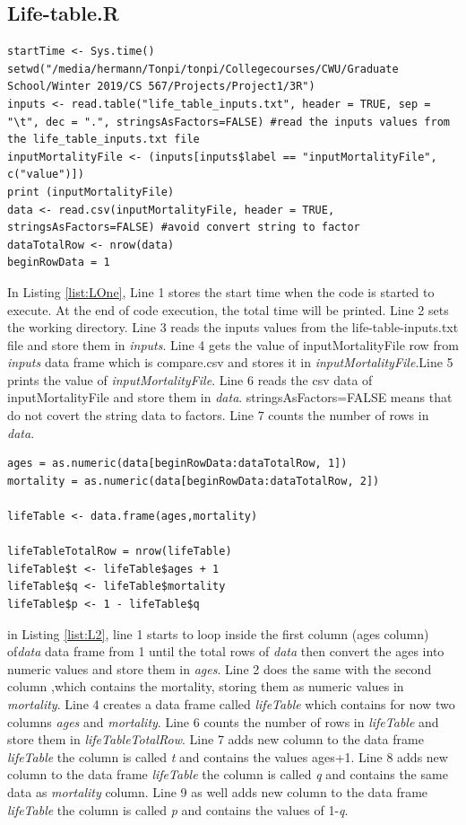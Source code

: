 \documentclass[12pt]{article}
\begin{document}
\subsection{Life-table.R}
\begin{lstlisting}[caption={ Reading The Data Part 1},captionpos=b,label={list:LOne}]
startTime <- Sys.time()
setwd("/media/hermann/Tonpi/tonpi/Collegecourses/CWU/Graduate School/Winter 2019/CS 567/Projects/Project1/3R")
inputs <- read.table("life_table_inputs.txt", header = TRUE, sep = "\t", dec = ".", stringsAsFactors=FALSE) #read the inputs values from the life_table_inputs.txt file
inputMortalityFile <- (inputs[inputs$label == "inputMortalityFile", c("value")])
print (inputMortalityFile)
data <- read.csv(inputMortalityFile, header = TRUE, stringsAsFactors=FALSE) #avoid convert string to factor
dataTotalRow <- nrow(data)
beginRowData = 1
\end{lstlisting}
In Listing \ref{list:LOne}, Line 1 stores the start time when the code is started to execute. At the end of code execution, the total time will be printed. Line 2 sets the working directory. Line 3 reads the inputs values from the life-table-inputs.txt file and store them in \textit{inputs}. Line 4 gets the value of inputMortalityFile row from \textit{inputs} data frame which is compare.csv and stores it in \textit{inputMortalityFile}.Line 5 prints the value of \textit{inputMortalityFile}. Line 6 reads the csv data of inputMortalityFile and store them in \textit{data}. stringsAsFactors=FALSE means that do not covert the string data to factors. Line 7 counts the number of rows in \textit{data}.
\begin{lstlisting}[caption={ Reading The Data Part 2},captionpos=b,label={list:L2}]
ages = as.numeric(data[beginRowData:dataTotalRow, 1])
mortality = as.numeric(data[beginRowData:dataTotalRow, 2])

lifeTable <- data.frame(ages,mortality)

lifeTableTotalRow = nrow(lifeTable)
lifeTable$t <- lifeTable$ages + 1
lifeTable$q <- lifeTable$mortality
lifeTable$p <- 1 - lifeTable$q
\end{lstlisting}
in Listing \ref{list:L2}, line 1 starts to loop inside the first column (ages column) of\textit{data} data frame from 1 until the total rows of \textit{data} then convert the ages into numeric values and store them in \textit{ages}. Line 2 does the same with the second column ,which contains the mortality, storing them as numeric values in \textit{mortality}. Line 4 creates a data frame called \textit{lifeTable} which contains for now two columns \textit{ages} and \textit{mortality}. Line 6 counts the number of rows in \textit{lifeTable} and store them in \textit{lifeTableTotalRow}. Line 7 adds new column to the data frame \textit{lifeTable} the column is called \textit{t} and contains the values ages+1. Line 8 adds new column to the data frame \textit{lifeTable} the column is called \textit{q} and contains the same data as \textit{mortality} column. Line 9 as well adds new column to the data frame \textit{lifeTable} the column is called \textit{p} and contains the values of 1-\textit{q}.
\end{document}
